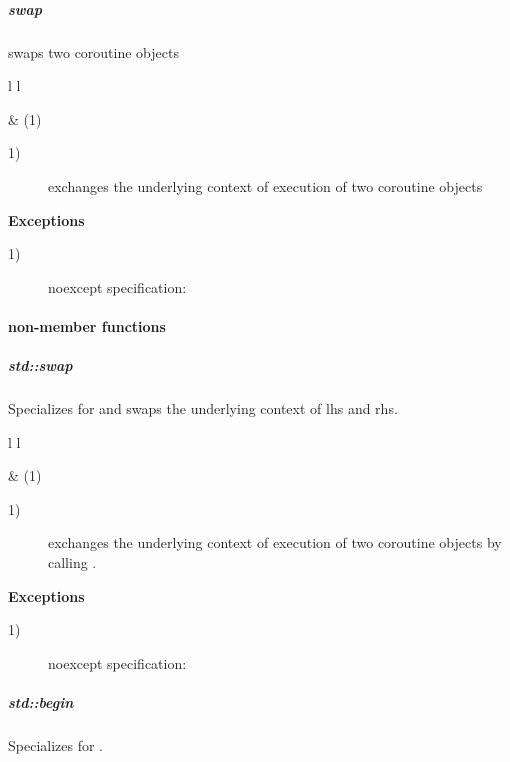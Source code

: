 \subparagraph*{swap}
swaps two coroutine objects\\

\begin{tabular}{ l l }
    \midrule

     & (1)\\

    \midrule
\end{tabular}

\begin{description}
    \item[1)] exchanges the underlying context of execution of two coroutine
              objects\\
\end{description}

{\bf Exceptions}
\begin{description}
    \item[1)] noexcept specification: \\
\end{description}

\paragraph*{non-member functions}
\subparagraph*{std::swap}
Specializes  for \pullcoro and swaps the underlying context of
lhs and rhs.\\

\begin{tabular}{ l l }
    \midrule

     & (1)\\

    \midrule
\end{tabular}

\begin{description}
    \item[1)] exchanges the underlying context of execution of two coroutine
              objects by calling .\\
\end{description}

{\bf Exceptions}
\begin{description}
    \item[1)] noexcept specification: \\
\end{description}

\subparagraph*{std::begin}
Specializes  for \pullcoro.\\

